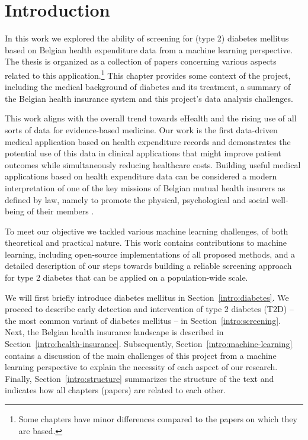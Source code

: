 \chapter{Introduction}\label{ch:introduction}

In this work we explored the ability of screening for (type 2) diabetes mellitus based on Belgian health expenditure data from a machine learning perspective. The thesis is organized as a collection of papers concerning various aspects related to this application.\footnote{Some chapters have minor differences compared to the papers on which they are based.} This chapter provides some context of the project, including the medical background of diabetes and its treatment, a summary of the Belgian health insurance system and this project's data analysis challenges. 

This work aligns with the overall trend towards eHealth and the rising use of all sorts of data for evidence-based medicine. Our work is the first data-driven medical application based on health expenditure records and demonstrates the potential use of this data in clinical applications that might improve patient outcomes while simultaneously reducing healthcare costs. Building useful medical applications based on health expenditure data can be considered a modern interpretation of one of the key missions of Belgian mutual health insurers as defined by law, namely to promote the physical, psychological and social well-being of their members \citep{ziekenfondswet}.

To meet our objective we tackled various machine learning challenges, of both theoretical and practical nature. This work contains contributions to machine learning, including open-source implementations of all proposed methods, and a detailed description of our steps towards building a reliable screening approach for type 2 diabetes that can be applied on a population-wide scale.

We will first briefly introduce diabetes mellitus in Section~\ref{intro:diabetes}. We proceed to describe early detection and intervention of type 2 diabetes (T2D) -- the most common variant of diabetes mellitus -- in Section~\ref{intro:screening}. Next, the Belgian health insurance landscape is described in Section~\ref{intro:health-insurance}. Subsequently, Section~\ref{intro:machine-learning} contains a discussion of the main challenges of this project from a machine learning perspective to explain the necessity of each aspect of our research. Finally, Section~\ref{intro:structure} summarizes the structure of the text and indicates how all chapters (papers) are related to each other.

